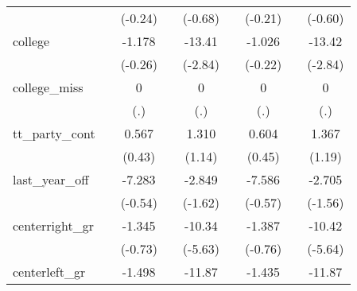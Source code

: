 {\begin{tabular}{l*{8}{c}}
            &                     &     (-0.24)         &                     &     (-0.68)         &                     &     (-0.21)         &                     &     (-0.60)         \\
[1em]
college     &                     &      -1.178         &                     &      -13.41\sym{**} &                     &      -1.026         &                     &      -13.42\sym{**} \\
            &                     &     (-0.26)         &                     &     (-2.84)         &                     &     (-0.22)         &                     &     (-2.84)         \\
[1em]
college\_miss&                     &           0         &                     &           0         &                     &           0         &                     &           0         \\
            &                     &         (.)         &                     &         (.)         &                     &         (.)         &                     &         (.)         \\
[1em]
tt\_party\_cont&                     &       0.567         &                     &       1.310         &                     &       0.604         &                     &       1.367         \\
            &                     &      (0.43)         &                     &      (1.14)         &                     &      (0.45)         &                     &      (1.19)         \\
[1em]
last\_year\_off&                     &      -7.283         &                     &      -2.849         &                     &      -7.586         &                     &      -2.705         \\
            &                     &     (-0.54)         &                     &     (-1.62)         &                     &     (-0.57)         &                     &     (-1.56)         \\
[1em]
centerright\_gr&                     &      -1.345         &                     &      -10.34\sym{***}&                     &      -1.387         &                     &      -10.42\sym{***}\\
            &                     &     (-0.73)         &                     &     (-5.63)         &                     &     (-0.76)         &                     &     (-5.64)         \\
[1em]
centerleft\_gr&                     &      -1.498         &                     &      -11.87\sym{***}&                     &      -1.435         &                     &      -11.87\sym{***}\\

\end{tabular}}
